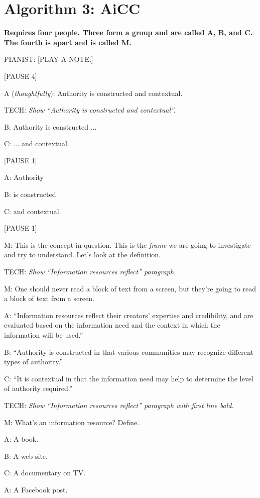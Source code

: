 \documentclass[17pt]{extarticle}
\begin{document}
\newpage

\section*{Algorithm 3: AiCC}

\textbf{Requires four people.  Three form a group and are called A, B, and C.  The fourth is apart and is called M.}

PIANIST:  [PLAY A NOTE.]

[PAUSE 4]

A (\textit{thoughtfully}):  Authority is constructed and contextual.

TECH:  \textit{Show ``Authority is constructed and contextual''.}

B:  Authority is constructed ...

C:  ... and contextual.

[PAUSE 1]

A:  Authority

B:  is constructed

C:  and contextual.

[PAUSE 1]

M:  This is the concept in question.  This is the \textit{frame} we are going to investigate and try to understand.  Let's look at the definition.

TECH:  \textit{Show ``Information resources reflect'' paragraph.}

M:  One should never read a block of text from a screen, but they're going to read a block of text from a screen.

A:  ``Information resources reflect their creators’ expertise and credibility, and are evaluated based on the information need and the context in which the information will be used.''

B:  ``Authority is constructed in that various communities may recognize different types of authority.''

C:  ``It is contextual in that the information need may help to determine the level of authority required.''

TECH:  \textit{Show ``Information resources reflect'' paragraph with first line bold.}

M:  What's an information resource?  Define.

A:  A book.

B:  A web site.

C:  A documentary on TV.

A:  A Facebook post.
\end{document}
